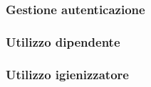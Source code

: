 \subsubsection{Gestione autenticazione}\label{sec:GestioneAutenticazineM}


\subsubsection{Utilizzo dipendente}\label{sec:Dipendente}


\subsubsection{Utilizzo igienizzatore}\label{sec:Igienizzatore}

